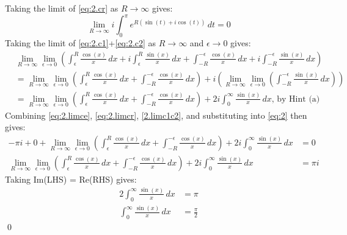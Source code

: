 \documentclass[a4paper, titlepage, DIV=14]{scrartcl}
\begin{document}
    Taking the limit of \eqref{eq:2.cr} as $R\to\infty$ gives:
    \begin{equation}
        \lim_{R\to\infty} i\int_{0}^{\pi}e^{R(\sin(t)+i\cos(t))} \, dt = 0 \label{eq:2.limcr}
    \end{equation}
    Taking the limit of \eqref{eq:2.c1}+\eqref{eq:2.c2} as $R\to\infty$ and $\epsilon\to0$ gives:
    \begin{align}
        &\lim_{R\to\infty}\lim_{\epsilon\to0} (\int_{\epsilon}^{R} \frac{\cos(x)}{x} \, dx + i\int_{\epsilon}^{R} \frac{\sin(x)}{x} \, dx + \int_{-R}^{-\epsilon} \frac{\cos(x)}{x} \, dx + i\int_{-R}^{-\epsilon} \frac{\sin(x)}{x} \, dx) \nonumber\\
        &= \lim_{R\to\infty}\lim_{\epsilon\to0}(\int_{\epsilon}^{R} \frac{\cos(x)}{x} \, dx + \int_{-R}^{-\epsilon} \frac{\cos(x)}{x} \, dx) + i (\lim_{R\to\infty}\lim_{\epsilon\to0}(\int_{-R}^{-\epsilon} \frac{\sin(x)}{x} \, dx)) \nonumber\\
        &= \lim_{R\to\infty}\lim_{\epsilon\to0}(\int_{\epsilon}^{R} \frac{\cos(x)}{x} \, dx + \int_{-R}^{-\epsilon} \frac{\cos(x)}{x} \, dx) + 2i\int_{0}^{\infty}\frac{\sin(x)}{x}\, dx, \, \text{by Hint (a)} \label{2.limc1c2}
    \end{align}
    Combining \eqref{eq:2.limce}, \eqref{eq:2.limcr}, \eqref{2.limc1c2}, and substituting into \eqref{eq:2} then gives:
    \begin{align*}
        -\pi i + 0 + \lim_{R\to\infty}\lim_{\epsilon\to0}(\int_{\epsilon}^{R} \frac{\cos(x)}{x} \, dx + \int_{-R}^{-\epsilon} \frac{\cos(x)}{x} \, dx) + 2i\int_{0}^{\infty}\frac{\sin(x)}{x}\, dx &= 0 \\
        \lim_{R\to\infty}\lim_{\epsilon\to0}(\int_{\epsilon}^{R} \frac{\cos(x)}{x} \, dx + \int_{-R}^{-\epsilon} \frac{\cos(x)}{x} \, dx) + 2i\int_{0}^{\infty}\frac{\sin(x)}{x}\, dx &= \pi i
    \end{align*}
    Taking Im(LHS) = Re(RHS) gives:
    \begin{align*}
        2\int_{0}^{\infty}\frac{\sin(x)}{x}\, dx &= \pi \\
        \int_{0}^{\infty}\frac{\sin(x)}{x}\, dx &= \frac{\pi}{2} 
    \end{align*} \qed
    
\end{document}
